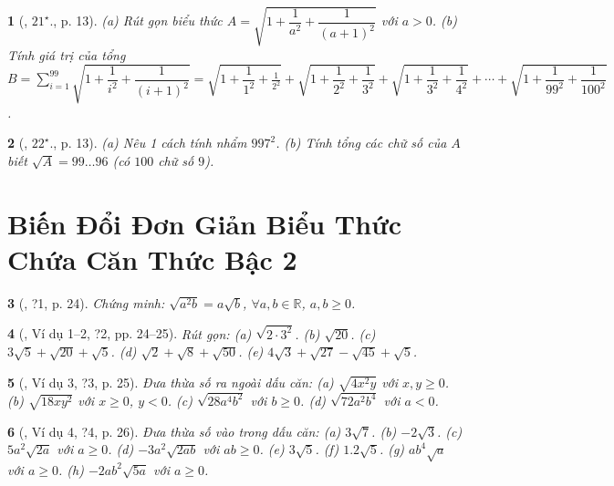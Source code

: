 \documentclass{article}
\newtheorem{baitoan}{}
\begin{document}
\begin{baitoan}[\cite{Binh_Toan_9_tap_1}, $21^\star$., p. 13]
	(a) Rút gọn biểu thức $A = \sqrt{1 + \dfrac{1}{a^2} + \dfrac{1}{(a + 1)^2}}$ với $a > 0$. (b) Tính giá trị của tổng $B = \sum_{i=1}^{99} \sqrt{1 + \dfrac{1}{i^2} + \dfrac{1}{(i + 1)^2}} = \sqrt{1 + \dfrac{1}{1^2} + \frac{1}{2^2}} + \sqrt{1 + \dfrac{1}{2^2} + \dfrac{1}{3^2}} + \sqrt{1 + \dfrac{1}{3^2} + \dfrac{1}{4^2}} + \cdots + \sqrt{1 + \dfrac{1}{99^2} + \dfrac{1}{100^2}}$.
\end{baitoan}

\begin{baitoan}[\cite{Binh_Toan_9_tap_1}, $22^\star$., p. 13]
	(a) Nêu 1 cách tính nhẩm $997^2$. (b) Tính tổng các chữ số của $A$ biết $\sqrt{A} = 99\ldots96$ (có $100$ chữ số $9$).
\end{baitoan}


\section{Biến Đổi Đơn Giản Biểu Thức Chứa Căn Thức Bậc 2}

\begin{baitoan}[\cite{SGK_Toan_9_tap_1}, ?1, p. 24]
	Chứng minh: $\sqrt{a^2b} = a\sqrt{b}$, $\forall a,b\in\mathbb{R}$, $a,b\ge0$.
\end{baitoan}

\begin{baitoan}[\cite{SGK_Toan_9_tap_1}, Ví dụ 1--2, ?2, pp. 24--25]
	Rút gọn: (a) $\sqrt{2\cdot3^2}$. (b) $\sqrt{20}$. (c) $3\sqrt{5} + \sqrt{20} + \sqrt{5}$. (d) $\sqrt{2} + \sqrt{8} + \sqrt{50}$. (e) $4\sqrt{3} + \sqrt{27} - \sqrt{45} + \sqrt{5}$.
\end{baitoan}

\begin{baitoan}[\cite{SGK_Toan_9_tap_1}, Ví dụ 3, ?3, p. 25]
	Đưa thừa số ra ngoài dấu căn: (a) $\sqrt{4x^2y}$ với $x,y\ge0$. (b) $\sqrt{18xy^2}$ với $x\ge0$, $y < 0$. (c) $\sqrt{28a^4b^2}$ với $b\ge0$. (d) $\sqrt{72a^2b^4}$ với $a < 0$.
\end{baitoan}

\begin{baitoan}[\cite{SGK_Toan_9_tap_1}, Ví dụ 4, ?4, p. 26]
	Đưa thừa số vào trong dấu căn: (a) $3\sqrt{7}$. (b) $-2\sqrt{3}$. (c) $5a^2\sqrt{2a}$ với $a\ge0$. (d) $-3a^2\sqrt{2ab}$ với $ab\ge0$. (e) $3\sqrt{5}$. (f) $1.2\sqrt{5}$. (g) $ab^4\sqrt{a}$ với $a\ge0$. (h) $-2ab^2\sqrt{5a}$ với $a\ge0$.
\end{baitoan}
\end{document}
